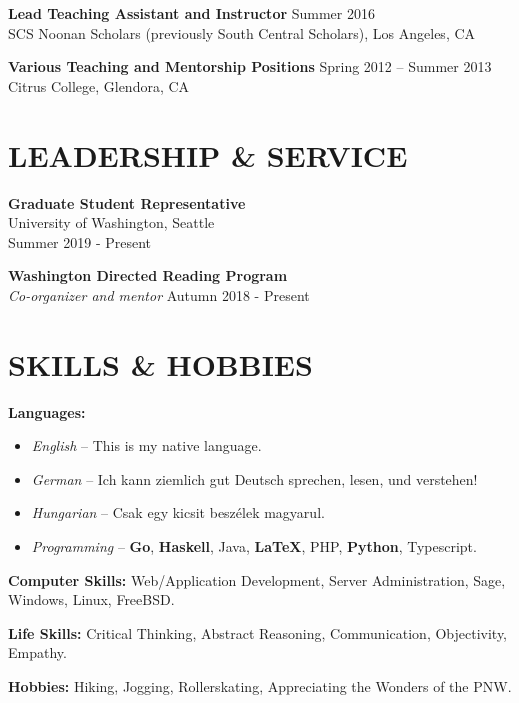 \documentclass[margin]{res} %
\begin{document}
\begin{resume}
{\bf Lead Teaching Assistant and Instructor} \hfill Summer 2016 \\
SCS Noonan Scholars (previously South Central Scholars), Los Angeles, CA

{\bf Various Teaching and Mentorship Positions} \hfill Spring 2012 -- Summer 2013 \\
Citrus College, Glendora, CA

\section{LEADERSHIP \& SERVICE}

{\bf Graduate Student Representative}\\
University of Washington, Seattle\\
Summer 2019 - Present

{\bf Washington Directed Reading Program}\\
{\sl Co-organizer and mentor}
Autumn 2018 - Present

\section{SKILLS \& HOBBIES} 

{\bf Languages:}
\begin{itemize} \itemsep -2pt
	\item {\sl English} -- This is my native language.
	\item {\sl German} -- Ich kann ziemlich gut Deutsch sprechen, lesen, und verstehen!
	\item {\sl Hungarian} -- Csak egy kicsit besz\'elek magyarul.
	\item {\sl Programming} -- {\bf Go}, {\bf Haskell}, Java, {\bf \LaTeX}, PHP, {\bf Python}, Typescript.
\end{itemize}
{\bf Computer Skills:} Web/Application Development, Server Administration, Sage, Windows, Linux, FreeBSD.

{\bf Life Skills:} Critical Thinking, Abstract Reasoning, Communication, Objectivity, Empathy.

{\bf Hobbies:} Hiking, Jogging, Rollerskating, Appreciating the Wonders of the PNW.



\end{resume}
\end{document}
